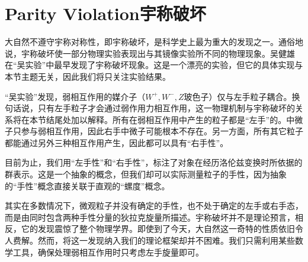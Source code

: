 \section[宇称破坏]{Parity Violation\quad 宇称破坏}\label{sec7.4}
\label{sec7.4}
大自然不遵守宇称对称性，即宇称破坏，是科学史上最为重大的发现之一。通俗地说，宇称破坏使一部分物理实验表现出与其镜像实验所不同的物理现象。吴健雄在“吴实验”中最早发现了宇称破坏现象。这是一个漂亮的实验，但它的具体实现与本节主题无关，因此我们将只关注实验结果。

“吴实验”发现，弱相互作用的媒介子（$W^+, W^-, Z$玻色子）仅与左手粒子耦合。换句话说，只有左手粒子才会通过弱作用力相互作用，这一物理机制与宇称破坏的关系将在本节结尾处加以解释。所有在弱相互作用中产生的粒子都是“左手”的。中微子只参与弱相互作用，因此右手中微子可能根本不存在。另一方面，所有其它粒子都能通过另外三种相互作用产生，因此都可以具有“右手性”。

目前为止，我们用“左手性”和“右手性”，标注了对象在经历洛伦兹变换时所依据的群表示。这是一个抽象的概念，但我们却可以实际测量粒子的手性，因为抽象的“手性”概念直接关联于直观的“螺度”概念。

其实在多数情况下，微观粒子并没有确定的手性，也不处于确定的左手或右手态，而是由同时包含两种手性分量的狄拉克旋量所描述。宇称破坏并不是理论预言，相反，它的发现震惊了整个物理学界。即使到了今天，大自然这一奇特的性质依旧令人费解。然而，将这一发现纳入我们的理论框架却并不困难。我们只需利用某些数学工具，确保处理弱相互作用时只考虑左手旋量即可。

